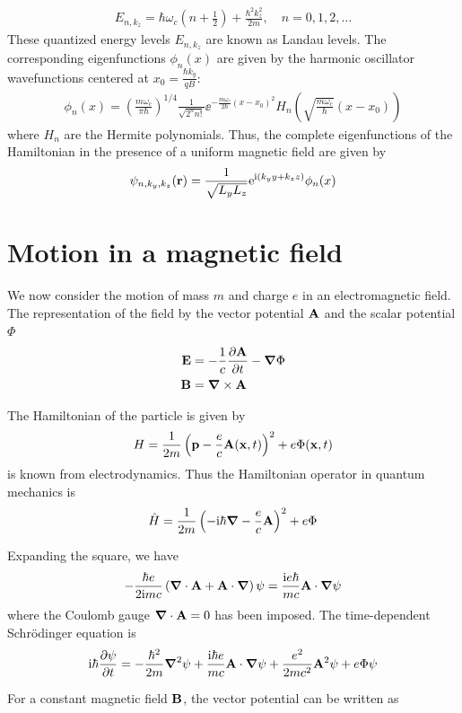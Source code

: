 \begin{align}
    E_{n, k_z} = \hbar \omega_c \left( n + \frac{1}{2} \right) + \frac{\hbar^2 k_z^2}{2m}, \quad n = 0, 1, 2, \ldots
\end{align}
These quantized energy levels $E_{n, k_z}$ are known as Landau levels. The corresponding eigenfunctions $\phi_n(x)$ are given by the harmonic oscillator wavefunctions centered at $x_0 = \frac{\hbar k_y}{q B}$:
\begin{align}
    \phi_n(x) = \left( \frac{m \omega_c}{\pi \hbar} \right)^{1/4} \frac{1}{\sqrt{2^n n!}} \ee^{-\frac{m \omega_c}{2 \hbar} (x - x_0)^2} H_n \left( \sqrt{\frac{m \omega_c}{\hbar}} (x - x_0) \right)
\end{align}
where $H_n$ are the Hermite polynomials. Thus, the complete eigenfunctions of the Hamiltonian in the presence of a uniform magnetic field are given by
\begin{align}
    \psi_{n, k_y, k_z}(\mathbf{r}) = \frac{1}{\sqrt{L_y L_z}} \mathrm{e}^{\mathrm{i} (k_y y + k_z z)} \phi_n(x)
\end{align}

\section{Motion in a magnetic field}

We now consider the motion of mass $m$ and charge $e$ in an electromagnetic field. The representation of the field by the vector potential $\mathbf{A}$ and the scalar potential $\Phi$ 
\begin{align*}
    \mathbf{E} & = - \frac{1}{c} \frac{\partial \mathbf{A}}{\partial t} - \boldsymbol{\nabla} \Phi \\ 
    \mathbf{B} & = \boldsymbol{\nabla} \times \mathbf{A}
\end{align*}

The Hamiltonian of the particle is given by 
\begin{align*}
    H = \frac{1}{2m} \left( \mathbf{p} - \frac{e}{c} \mathbf{A}(\mathbf{x},t) \right)^2 + e \Phi(\mathbf{x},t)
\end{align*}
is known from electrodynamics. Thus the Hamiltonian operator in quantum mechanics is 
\begin{align}
    \hat{H} = \frac{1}{2m} \left( - \mathrm{i} \hbar \boldsymbol{\nabla} - \frac{e}{c}\mathbf{A} \right)^2 + e \Phi
\end{align}

Expanding the square, we have 
\begin{align*}
    - \frac{\hbar e}{2 \mathrm{i} m c} \left( \boldsymbol{\nabla}\cdot \mathbf{A} + \mathbf{A} \cdot \boldsymbol{\nabla} \right) \psi = \frac{\mathrm{i} e \hbar}{m c} \mathbf{A} \cdot \boldsymbol{\nabla} \psi
\end{align*}
where the Coulomb gauge $\boldsymbol{\nabla} \cdot \mathbf{A} = 0$ has been imposed. 
The time-dependent Schrödinger equation is 
\begin{align*}
    \mathrm{i} \hbar \frac{\partial \psi}{\partial t} = - \frac{\hbar^2}{2m} \boldsymbol{\nabla}^2 \psi + \frac{\mathrm{i} \hbar e}{m c} \mathbf{A} \cdot \boldsymbol{\nabla}\psi + \frac{e^2}{2 m c^2} \mathbf{A}^2 \psi + e \Phi \psi
\end{align*}

For a constant magnetic field $\mathbf{B}$, the vector potential can be written as 

